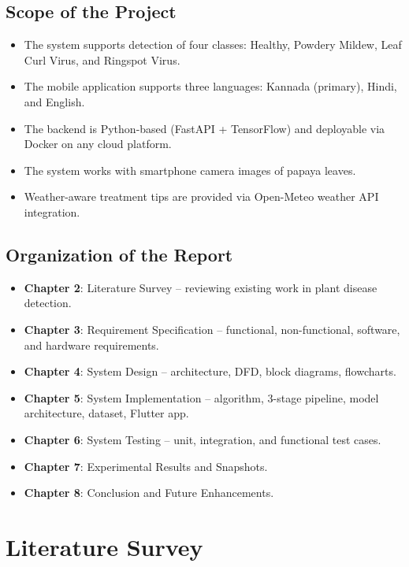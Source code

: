 \documentclass[12pt,a4paper]{report}
\begin{document}
\section{Scope of the Project}
\begin{itemize}
    \item The system supports detection of four classes: Healthy, Powdery Mildew, Leaf Curl Virus, and Ringspot Virus.
    \item The mobile application supports three languages: Kannada (primary), Hindi, and English.
    \item The backend is Python-based (FastAPI + TensorFlow) and deployable via Docker on any cloud platform.
    \item The system works with smartphone camera images of papaya leaves.
    \item Weather-aware treatment tips are provided via Open-Meteo weather API integration.
\end{itemize}

\section{Organization of the Report}
\begin{itemize}
    \item \textbf{Chapter 2}: Literature Survey -- reviewing existing work in plant disease detection.
    \item \textbf{Chapter 3}: Requirement Specification -- functional, non-functional, software, and hardware requirements.
    \item \textbf{Chapter 4}: System Design -- architecture, DFD, block diagrams, flowcharts.
    \item \textbf{Chapter 5}: System Implementation -- algorithm, 3-stage pipeline, model architecture, dataset, Flutter app.
    \item \textbf{Chapter 6}: System Testing -- unit, integration, and functional test cases.
    \item \textbf{Chapter 7}: Experimental Results and Snapshots.
    \item \textbf{Chapter 8}: Conclusion and Future Enhancements.
\end{itemize}

\chapter{Literature Survey}
\end{document}
